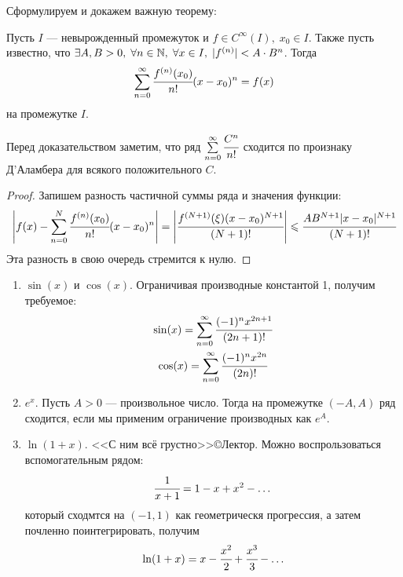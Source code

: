 \documentclass[a4paper, 12pt]{article}
\begin{document}
Сформулируем и докажем важную теорему:
\begin{Theorem}
    Пусть $I$ --- невырожденный промежуток и $f \in C^{\infty}(I),\; x_0 \in I$. Также пусть известно, что $\exists A, B>0,\; \forall n\in \mathbb{N},\; \forall x\in I,\; |f^{(n)}| < A\cdot B^n$. Тогда 
    \[
        \sum\limits_{n = 0}^{\infty} \cfrac{f^{(n)}(x_0)}{n!}(x-x_0)^n = f(x)
    \]
    на промежутке $I$.
\end{Theorem}
Перед доказательством заметим, что ряд $\sum\limits_{n=0}^{\infty}\cfrac{C^n}{n!}$ сходится по произнаку Д'Аламбера для всякого положительного $C$. 
\begin{proof}
    Запишем разность частичной суммы ряда и значения функции:
    \begin{gather*}
        \left| f(x) - \sum\limits_{n=0}^{N} \cfrac{f^{(n)}(x_0)}{n!} (x-x_0)^n\right| = 
        \left| \cfrac{f^{(N+1)}(\xi) (x-x_0)^{N+1}}{(N+1)!} \right| \leqslant \cfrac{AB^{N+1}|x-x_0|^{N+1}}{(N+1)!}
    \end{gather*}
    Эта разность в свою очередь стремится к нулю.
\end{proof}
\begin{Examples}
    \begin{enumerate}
        \item $\sin(x)$ и $\cos(x)$. Ограничивая производные константой 1, получим требуемое:
        \begin{gather*}
            \sin(x) = \sum\limits_{n=0}^{\infty} \cfrac{(-1)^n x^{2n+1}}{(2n+1)!}\\
            \cos(x) = \sum\limits_{n=0}^{\infty} \cfrac{(-1)^n x^{2n}}{(2n)!}
        \end{gather*}
        \item $e^x$. Пусть $A>0$ --- произвольное число. Тогда на промежутке $(-A, A)$ ряд сходится, если мы применим ограничение производных как $e^A$.
        \item $\ln(1+x)$. <<С ним всё грустно>>\copyright Лектор. Можно воспрользоваться вспомогательным рядом:
        \[
            \cfrac{1}{x+1} = 1 - x + x^2 - \ldots\\
        \]
        который сходмтся на $(-1, 1)$ как геометрическя прогрессия, а затем почленно поинтегрировать, получим
        \[
            \ln(1+x) = x - \cfrac{x^2}{2} + \cfrac{x^3}{3} - \ldots
        \]
    \end{enumerate}
\end{Examples}
\end{document}
